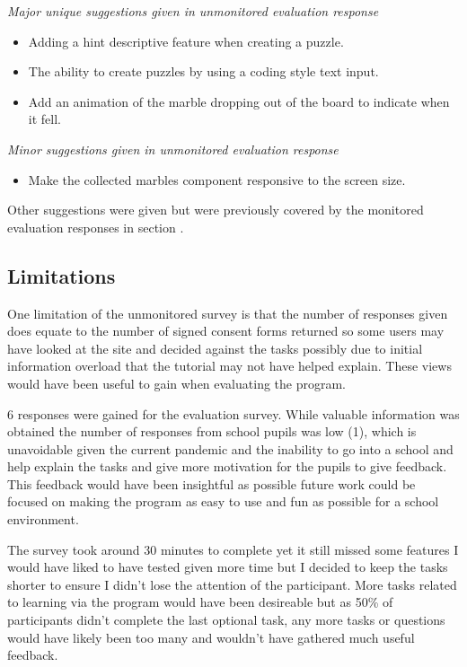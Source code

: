 \documentclass{l4proj}
\begin{document}
\emph{Major unique suggestions given in unmonitored evaluation response}
\begin{itemize}
    \item Adding a hint descriptive feature when creating a puzzle.
    \item The ability to create puzzles by using a coding style text input.
    \item Add an animation of the marble dropping out of the board to indicate when it fell.
\end{itemize}

\emph{Minor suggestions given in unmonitored evaluation response}
\begin{itemize}
    \item Make the collected marbles component responsive to the screen size.
\end{itemize}

Other suggestions were given but were previously covered by the monitored evaluation responses in section .

\subsection{Limitations}
One limitation of the unmonitored survey is that the number of responses given does equate to the number of signed consent forms returned so some users may have looked at the site and decided against the tasks possibly due to initial information overload that the tutorial may not have helped explain. These views would have been useful to gain when evaluating the program.

6 responses were gained for the evaluation survey. While valuable information was obtained the number of responses from school pupils was low (1), which is unavoidable given the current pandemic and the inability to go into a school and help explain the tasks and give more motivation for the pupils to give feedback. This feedback would have been insightful as possible future work could be focused on making the program as easy to use and fun as possible for a school environment. 

The survey took around 30 minutes to complete yet it still missed some features I would have liked to have tested given more time but I decided to keep the tasks shorter to ensure I didn't lose the attention of the participant. More tasks related to learning via the program would have been desireable but as 50\% of participants didn't complete the last optional task, any more tasks or questions would have likely been too many and wouldn't have gathered much useful feedback.
\end{document}
